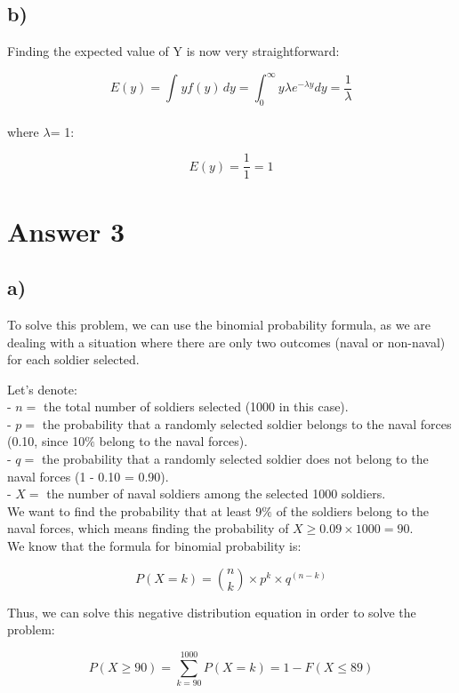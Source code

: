 \documentclass[12pt]{article}
\begin{document}
\subsection*{b)} 

Finding the expected value of Y is now very straightforward:

\[ E(y) =  \int_{ }^{ } yf(y)\, dy = \int_{0}^{\infty } y\lambda e^{-\lambda y} dy = \frac{1}{\lambda}\] \\

where \( \lambda \)= 1:

\[ E(y) = \frac{1}{1} = 1 \]


\section*{Answer 3}
\subsection*{a)} 

To solve this problem, we can use the binomial probability formula, as we are dealing with a situation where there are only two outcomes (naval or non-naval) for each soldier selected.

Let's denote: \\
- \( n = \)  the total number of soldiers selected (1000 in this case).\\
- \( p =\) the probability that a randomly selected soldier belongs to the naval forces (0.10, since 10$\% $ belong to the naval forces).\\
- \( q =\) the probability that a randomly selected soldier does not belong to the naval forces (1 - 0.10 = 0.90).\\
- \( X =\) the number of naval soldiers among the selected 1000 soldiers.\\

We want to find the probability that at least 9$\%$ of the soldiers belong to the naval forces, which means finding the probability of \( X \geq 0.09 \times 1000 = 90 \).\\


We know that the formula for binomial probability is:

\[ P(X = k) = \binom{n}{k} \times p^k \times q^{(n-k)} \]

Thus, we can solve this negative distribution equation in order to solve the problem:

\[
P(X \geq 90) = \sum_{k=90}^{1000} P(X = k) = 1 - F(X \leq 89)
\]
\end{document}
